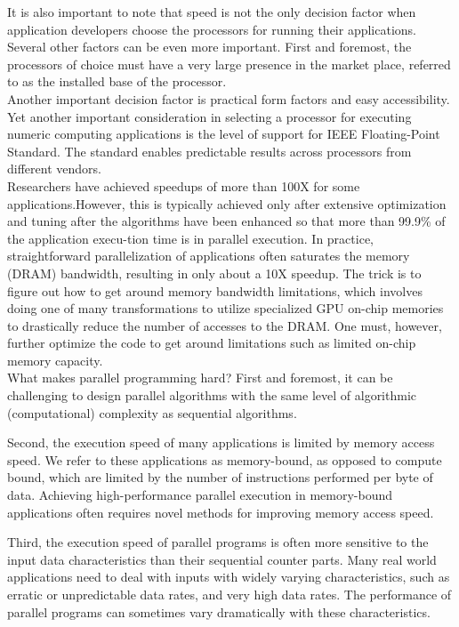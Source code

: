 \documentclass[11pt]{ctexart}
\begin{document}
It is also important to note that speed is not the only decision factor when application developers choose the processors for running their applications. Several other
factors can be even more important. First and foremost, the processors of choice must
have a very large presence in the market place, referred to as the installed base of
the processor.\\

Another important decision factor is practical form factors and easy accessibility.\\

Yet another important consideration in selecting a processor for executing numeric computing applications is the level of support for IEEE Floating-Point Standard. The standard enables predictable results across processors from different vendors. \\

Researchers have achieved speedups of more than 100X for some applications.However, this is typically achieved only after extensive optimization and tuning after the algorithms have been enhanced so that more than 99.9\% of the application execu-tion time is in parallel execution. In practice, straightforward parallelization of applications often saturates the memory (DRAM) bandwidth, resulting in only about a 10X speedup. The trick is to figure out how to get around memory bandwidth limitations, which involves doing one of many transformations to utilize specialized GPU
on-chip memories to drastically reduce the number of accesses to the DRAM. One
must, however, further optimize the code to get around limitations such as limited
on-chip memory capacity.\\

What makes parallel programming hard? First and foremost, it can be challenging to design parallel algorithms
with the same level of algorithmic (computational) complexity as sequential algorithms. 

Second, the execution speed of many applications is limited by memory access speed. We refer to these applications as memory-bound, as opposed to compute
bound, which are limited by the number of instructions performed per byte of data.
Achieving high-performance parallel execution in memory-bound applications often requires novel methods for improving memory access speed.

Third, the execution speed of parallel programs is often more sensitive to the input data characteristics than their sequential counter parts. Many real world applications need to deal with inputs with widely varying characteristics, such as erratic or unpredictable data rates, and very high data rates. The performance of parallel programs can sometimes vary dramatically with these characteristics.
\end{document}
